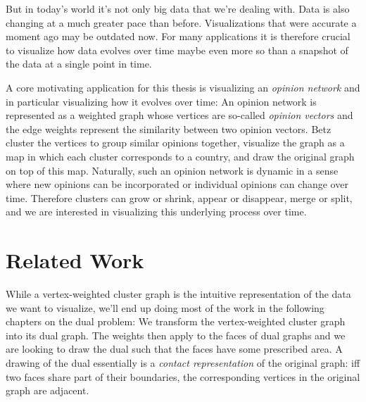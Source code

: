 But in today's world it's not only big data that we're dealing with. Data is also changing at a much greater pace than before. Visualizations that were accurate a moment ago may be outdated now. For many applications it is therefore crucial to visualize how data evolves over time \emdash{} maybe even more so than a snapshot of the data at a single point in time.

A core motivating application for this thesis is visualizing an \emph{opinion network} \cite{betz2019applying} and in particular visualizing how it evolves over time: An opinion network is represented as a weighted graph whose vertices are so-called \emph{opinion vectors} and the edge weights represent the similarity between two opinion vectors. Betz \etal{} cluster the vertices to group similar opinions together, visualize the graph as a map in which each cluster corresponds to a country, and draw the original graph on top of this map. Naturally, such an opinion network is dynamic in a sense where new opinions can be incorporated or individual opinions can change over time. Therefore clusters can grow or shrink, appear or disappear, merge or split, and we are interested in visualizing this underlying process over time.

\cite{dobbins2018forall}

\section{Related Work}
\label{sect:related-work}



While a vertex-weighted cluster graph is the intuitive representation of the data we want to visualize, we'll end up doing most of the work in the following chapters on the dual problem: We transform the vertex-weighted cluster graph into its dual graph. The weights then apply to the faces of dual graphs and we are looking to draw the dual such that the faces have some prescribed area. A drawing of the dual essentially is a \emph{contact representation} of the original graph: iff two faces share part of their boundaries, the corresponding vertices in the original graph are adjacent.

